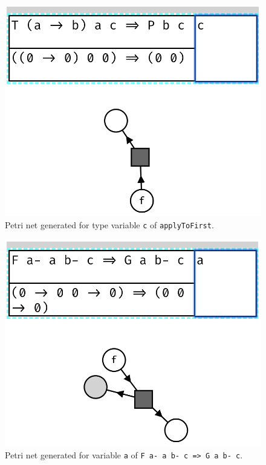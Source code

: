 \documentclass[11pt,openright,hidelinks,a4paper]{article}
\begin{document}
\begin{figure}[H]
\begin{center}
\includegraphics[scale=0.45]{applytofirstc}
\end{center}
\caption{Petri net generated for type variable \lstinline{c} of \lstinline{applyToFirst}.}
\label{fig:applyToFirstC}
\end{figure}

\begin{figure}[H]
\begin{center}
\includegraphics[scale=0.45]{typea}
\end{center}
\caption{Petri net generated for variable \lstinline{a} of \lstinline{F a- a b- c => G a b- c}.}
\label{fig:typea}
\end{figure}
\end{document}
